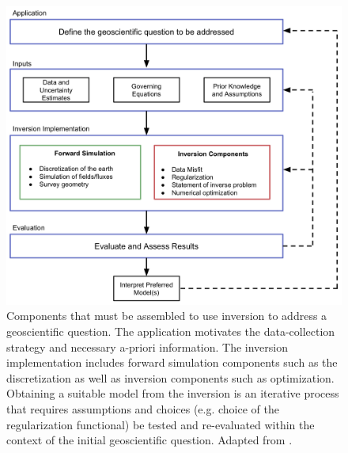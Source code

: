 \documentclass[paper]{geophysics}
\begin{document}
\begin{figure}
    \begin{center}
    \includegraphics[width=0.8\columnwidth]{figures/InversionWorkflowBullets.png}
    \end{center}
\caption{
    Components that must be assembled to use inversion to address a geoscientific question.
    The application motivates the data-collection strategy and necessary a-priori information.
    The inversion implementation includes forward simulation components such as the discretization
    as well as inversion components such as optimization.
    Obtaining a suitable model from the inversion is an iterative process
    that requires assumptions and choices (e.g. choice of the regularization functional) be tested and re-evaluated within the context of the
    initial geoscientific question.
    Adapted from \cite{Cockett2015}.
}
\label{fig:InversionWorkflowBullets}
\end{figure}
\end{document}
